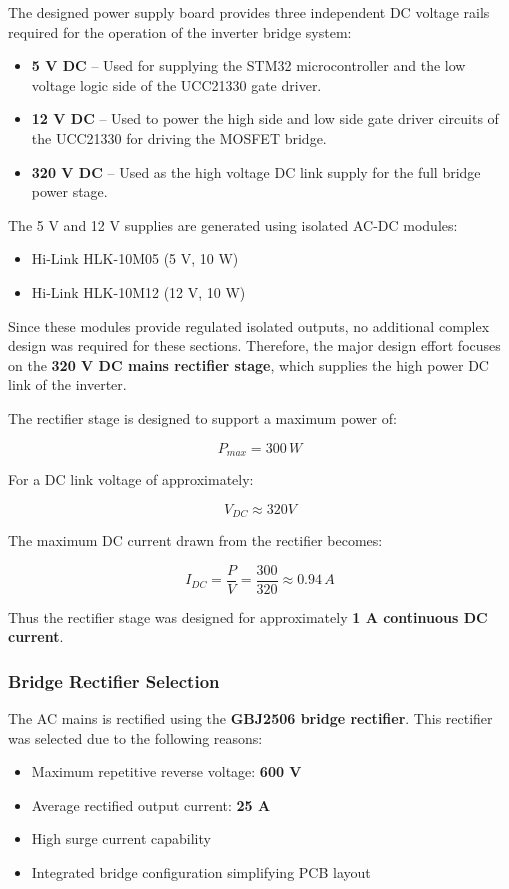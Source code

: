 The designed power supply board provides three independent DC voltage rails required for the operation of the inverter bridge system:

\begin{itemize}
\item \textbf{5 V DC} – Used for supplying the STM32 microcontroller and the low voltage logic side of the UCC21330 gate driver.
\item \textbf{12 V DC} – Used to power the high side and low side gate driver circuits of the UCC21330 for driving the MOSFET bridge.
\item \textbf{320 V DC} – Used as the high voltage DC link supply for the full bridge power stage.
\end{itemize}

The 5 V and 12 V supplies are generated using isolated AC-DC modules:

\begin{itemize}
\item Hi-Link HLK-10M05 (5 V, 10 W)
\item Hi-Link HLK-10M12 (12 V, 10 W)
\end{itemize}

Since these modules provide regulated isolated outputs, no additional complex design was required for these sections. Therefore, the major design effort focuses on the \textbf{320 V DC mains rectifier stage}, which supplies the high power DC link of the inverter.

The rectifier stage is designed to support a maximum power of:

\[
P_{max} = 300\,W
\]

For a DC link voltage of approximately:

\[
V_{DC} \approx 320V
\]

The maximum DC current drawn from the rectifier becomes:

\[
I_{DC} = \frac{P}{V} = \frac{300}{320} \approx 0.94\,A
\]

Thus the rectifier stage was designed for approximately \textbf{1 A continuous DC current}.

\subsubsection{Bridge Rectifier Selection}

The AC mains is rectified using the \textbf{GBJ2506 bridge rectifier}.  
This rectifier was selected due to the following reasons:

\begin{itemize}
\item Maximum repetitive reverse voltage: \textbf{600 V}
\item Average rectified output current: \textbf{25 A}
\item High surge current capability
\item Integrated bridge configuration simplifying PCB layout
\end{itemize}

